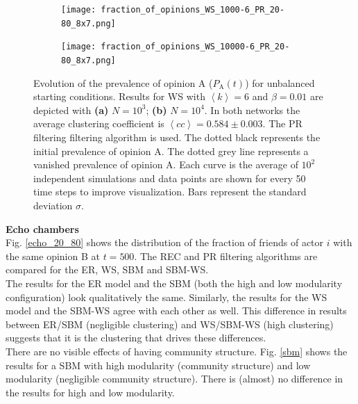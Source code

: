 \documentclass[11 pt , letterpaper , twoside , openright]{book}
\begin{document}
\begin{figure}[H]
  \begin{subfigure}[b]{0.49\textwidth}
    \caption{}
  	\texttt{[image: fraction\_of\_opinions\_WS\_1000-6\_PR\_20-80\_8x7.png]}
    \label{ws1000}
  \end{subfigure}
  \begin{subfigure}[b]{0.49\textwidth}
    \caption{}
  	\texttt{[image: fraction\_of\_opinions\_WS\_10000-6\_PR\_20-80\_8x7.png]}
    \label{ws10000}
  \end{subfigure}
  \captionsetup{format=plain}
  \caption[Evolution of the prevalence of opinion A ($P_\text{A}(t)$) for unbalanced starting conditions. A WS model with $N=10^3$ or $N=10^4$, $\left<k\right>=6$ and $\beta = 0.01$ is implemented. The PR filtering algorithm is used.]{Evolution of the prevalence of opinion A ($P_\text{A}(t)$) for unbalanced starting conditions. Results for WS with $\left<k\right> = 6$ and $\beta = 0.01$ are depicted with \textbf{(a)} $N=10^3$; \textbf{(b)} $N=10^4$. In both networks the average clustering coefficient is $\left<cc\right> = 0.584 \pm 0.003$. The PR filtering filtering algorithm is used. The dotted black represents the initial prevalence of opinion A. The dotted grey line represents a vanished prevalence of opinion A. Each curve is the average of $10^2$ independent simulations and data points are shown for every 50 time steps to improve visualization. Bars represent the standard deviation $\sigma$.}
\label{ev_op_WS_k=6}
\end{figure}
\noindent
\textbf{Echo chambers}\\
\newline
Fig. \ref{echo_20_80} shows the distribution of the fraction of friends of actor $i$ with the same opinion B at $t=500$.  The REC and PR filtering algorithms are compared for the ER, WS, SBM and SBM-WS.\\
\newline
The results for the ER model and the SBM (both the high and low modularity configuration) look qualitatively the same. Similarly, the results for the WS model and the SBM-WS agree with each other as well. This difference in results between ER/SBM (negligible clustering) and WS/SBM-WS (high clustering) suggests that it is the clustering that drives these differences.\\
\newline
There are no visible effects of having community structure. Fig. \ref{sbm} shows the results for a SBM with high modularity (community structure) and low modularity (negligible community structure). There is (almost) no difference in the results for high and low modularity.
\end{document}
